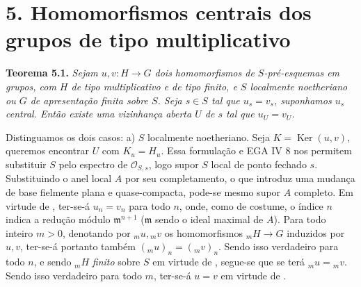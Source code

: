 
\section*{5. Homomorfismos centrais dos
grupos de tipo multiplicativo}


\medskip
\noindent{}\textbf{Teorema 5.1.}
\textit{Sejam \(u,v:H\to G\) dois homomorfismos de
\(S\)-pré-esquemas em grupos, com \(H\) de tipo multiplicativo
e de tipo finito, e \(S\) localmente noetheriano ou \(G\) de
apresentação finita sobre \(S\). Seja \(s\in S\) tal que
\(u_s=v_s\), suponhamos \(u_s\) central. Então existe uma
vizinhança aberta \(U\) de \(s\) tal que \(u_U=v_U\).}

Distinguamos os dois casos:
a) \(S\)
localmente noetheriano. Seja \(K=\operatorname{Ker}(u,v)\),
queremos encontrar \(U\) com \(K_u=H_u\). Essa formulação e
EGA IV 8 nos permitem substituir \(S\) pelo espectro de
\(\mathscr O_{S,s}\), logo supor \(S\) local de ponto fechado
\(s\). Substituindo o anel local \(A\) por seu completamento,
o que introduz uma mudança de base fielmente plana e
quase-compacta, pode-se mesmo supor \(A\) completo. Em virtude
de , ter-se-á \(u_n=v_n\)
para todo \(n\), onde, como de costume, o índice \(n\) indica
a redução módulo \(\mathfrak m^{n+1}\) (\(\mathfrak m\) sendo
o ideal maximal de \(A\)). Para todo inteiro \(m>0\), denotando
por \({}_mu,{}_mv\) os homomorfismos \({}_mH\to G\) induzidos
por \(u,v\), ter-se-á portanto também
\(({}_mu)_n=({}_mv)_n\). Sendo isso verdadeiro para todo \(n\),
e sendo \({}_mH\) \emph{finito} sobre \(S\) em virtude de
, segue-se que se terá
\({}_mu={}_mv\). Sendo isso verdadeiro para todo \(m\), ter-se-á
\(u=v\) em virtude de
.
\label{fnref:IX-30}

